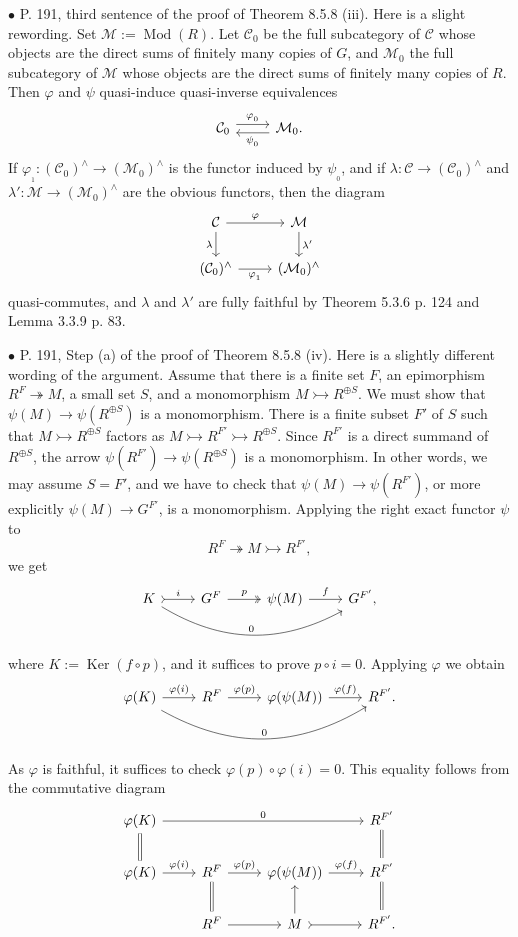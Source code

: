 \documentclass[12pt]{article}
\theoremstyle{remark}
\newcommand{\bu}{\bullet}
\newcommand{\n}{\noindent}
\newcommand{\C}{\mathcal C}
\newcommand{\M}{\mathcal M}
\newcommand{\epi}{\twoheadrightarrow}
\newcommand{\m}{\rightarrowtail}
\newcommand{\p}{\varphi}
\DeclareMathOperator{\Ker}{Ker}
\DeclareMathOperator{\Mod}{Mod}
\begin{document}
\n$\bu$ P. 191, third sentence of the proof of Theorem 8.5.8 (iii). Here is a slight rewording. Set $\M:=\Mod(R)$. Let $\C_0$ be the full subcategory of $\C$ whose objects are the direct sums of finitely many copies of $G$, and $\M_0$ the full subcategory of $\M$ whose objects are the direct sums of finitely many copies of $R$. Then $\p$ and $\psi$ quasi-induce quasi-inverse equivalences 
$$
\begin{tikzcd}
\C_0\ar[yshift=.7ex]{r}{\p_{{}_0}}&\M_0.\ar[yshift=-.7ex]{l}{\psi_{{}_0}}
\end{tikzcd}
$$ 
If $\p_{{}_1}:(\C_0)^\wedge\to(\M_0)^\wedge$ is the functor induced by $\psi_{{}_0}$, and if $\lambda:\C\to(\C_0)^\wedge$ and $\lambda':\M\to(\M_0)^\wedge$ are the obvious functors, then the diagram 
$$
\begin{tikzcd}
\C\ar{r}{\p}\ar{d}[swap]{\lambda}&\M\ar{d}{\lambda'}\\
(\C_0)^\wedge\ar{r}[swap]{\p_{{}_1}}&(\M_0)^\wedge
\end{tikzcd}
$$ 
quasi-commutes, and $\lambda$ and $\lambda'$ are fully faithful by Theorem 5.3.6 p. 124 and Lemma 3.3.9 p. 83. 


\n$\bu$ P. 191, Step (a) of the proof of Theorem 8.5.8 (iv). Here is a slightly different wording of the argument. Assume that there is a finite set $F$, an epimorphism $R^F\epi M$, a small set $S$, and a monomorphism $M\m R^{\oplus S}$. We must show that $\psi(M)\to\psi(R^{\oplus S})$ is a monomorphism. There is a finite subset $F'$ of $S$ such that $M\m R^{\oplus S}$ factors as $M\m R^{F'}\m R^{\oplus S}$. Since $R^{F'}$ is a direct summand of $R^{\oplus S}$, the arrow $\psi(R^{F'})\to\psi(R^{\oplus S})$ is a monomorphism. In other words, we may assume $S=F'$, and we have to check that $\psi(M)\to\psi(R^{F'})$, or more explicitly $\psi(M)\to G^{F'}$, is a monomorphism. Applying the right exact functor $\psi$ to 
$$
R^F\epi M\m R^{F'},
$$
we get 
$$
\begin{tikzcd}
K\ar[tail]{r}{i}\ar[bend right]{rrr}{0}&G^F\ar[two heads]{r}{p}&\psi(M)\ar{r}{f}&G^{F'},
\end{tikzcd}
$$
where $K:=\Ker(f\circ p)$, and it suffices to prove $p\circ i=0$. Applying $\p$ we obtain
$$
\begin{tikzcd}
\p(K)\ar{r}{\p(i)}\ar[bend right]{rrr}{0}&R^F\ar{r}{\p(p)}&\p(\psi(M))\ar{r}{\p(f)}&R^{F'}.
\end{tikzcd}
$$
As $\p$ is faithful, it suffices to check $\p(p)\circ\p(i)=0$. This equality follows from the commutative diagram
$$
\begin{tikzcd}
\p(K)\ar[equal]{d}\ar{rrr}{0}&&&R^{F'}\ar[equal]{d}\\
\p(K)\ar{r}{\p(i)}&R^F\ar[equal]{d}\ar{r}{\p(p)}&\p(\psi(M))\ar{r}{\p(f)}&R^{F'}\ar[equal]{d}\\
&R^F\ar{r}&M\ar[tail]{r}\ar{u}&R^{F'}.
\end{tikzcd}
$$ 
\end{document}
